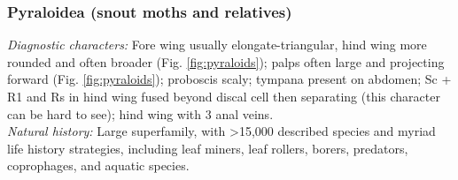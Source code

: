 \documentclass[letterpaper, 11pt]{article}
\begin{document}
\subsubsection{Pyraloidea (snout moths and relatives)}
\noindent{}\textit{Diagnostic characters:} Fore wing usually elongate-triangular, hind wing more rounded and often broader (Fig. \ref{fig:pyraloids}); palps often large and projecting forward (Fig. \ref{fig:pyraloids}); proboscis scaly; tympana present on abdomen; Sc + R1 and Rs in hind wing fused beyond discal cell then separating (this character can be hard to see); hind wing with 3 anal veins.\\

\noindent{}\textit{Natural history:} Large superfamily, with \textgreater{}15,000 described species and myriad life history strategies, including leaf miners, leaf rollers, borers, predators, coprophages, and aquatic species. 

\end{document}
